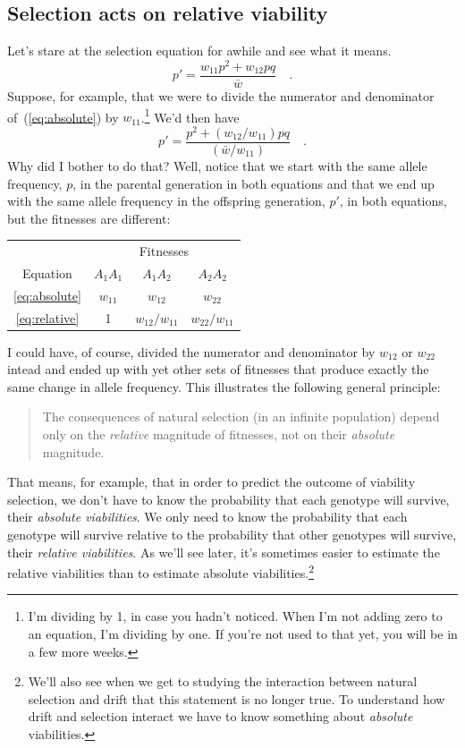 \subsection*{Selection acts on relative viability}

Let's stare at the selection equation for awhile and see what it
means.
\begin{equation}
p' = \frac{w_{11}p^2 + w_{12}pq}{\bar w} \quad . \label{eq:absolute}
\end{equation}
Suppose, for example, that we were to divide the numerator and
denominator of~(\ref{eq:absolute}) by $w_{11}$.\footnote{I'm dividing
  by 1, in case you hadn't noticed. When I'm not adding zero to an
  equation, I'm dividing by one. If you're not used to that yet, you
  will be in a few more weeks.} We'd then have
\begin{equation}
p' = \frac{p^2 + (w_{12}/w_{11})pq}{(\bar w/w_{11})} \quad . \label{eq:relative}
\end{equation}
Why did I bother to do that? Well, notice that we start with the same
allele frequency, $p$, in the parental generation in both equations
and that we end up with the same allele frequency in the offspring
generation, $p'$, in both equations, but the fitnesses are different:
\begin{center}
\begin{tabular}{c|ccc}
\hline\hline
         & \multicolumn{3}{c}{Fitnesses} \\
Equation & $A_1A_1$ & $A_1A_2$ & $A_2A_2$ \\
\hline
\ref{eq:absolute} & $w_{11}$ & $w_{12}$ & $w_{22}$ \\
\ref{eq:relative} & 1 & $w_{12}/w_{11}$ & $w_{22}/w_{11}$ \\
\hline
\end{tabular}
\end{center}
I could have, of course, divided the numerator and denominator by
$w_{12}$ or $w_{22}$ intead and ended up with yet other sets of
fitnesses that produce exactly the same change in allele
frequency. This illustrates the following general principle:
\begin{quote}
The consequences of natural selection (in an infinite population)
depend only on the {\it relative\/} magnitude of fitnesses, not on
their {\it absolute\/} magnitude.
\end{quote}
That means, for example, that in order to predict the outcome of
viability selection, we don't have to know the probability that each
genotype will survive, their {\it absolute viabilities}. We only need
to know the probability that each genotype will survive relative to
the probability that other genotypes will survive, their {\it relative
  viabilities}. As we'll see later, it's sometimes easier to estimate
the relative viabilities than to estimate absolute
viabilities.\footnote{We'll also see when we get to studying the
  interaction between natural selection and drift that this statement
  is no longer true. To understand how drift and selection interact we
  have to know something about {\it absolute\/} viabilities.}

